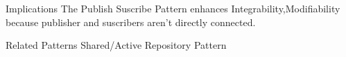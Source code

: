 \begin{patdescription}
\item[Implications] %
The Publish Suscribe Pattern enhances Integrability,Modifiability because publisher and suscribers aren't directly connected.%

\item [Related Patterns]
Shared/Active Repository Pattern


\end{patdescription}

